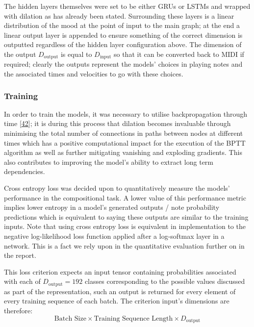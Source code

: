 \documentclass[12pt,]{article}
\begin{document}
The hidden layers themselves were set to be either GRUs or LSTMs and
wrapped with dilation as has already been stated. Surrounding these
layers is a linear distribution of the mood at the point of input to the
main graph; at the end a linear output layer is appended to ensure
something of the correct dimension is outputted regardless of the hidden
layer configuration above. The dimension of the output
\(D_{\text{output}}\) is equal to \(D_{\text{input}}\) so that it can be
converted back to MIDI if required; clearly the outputs represent the
models' choices in playing notes and the associated times and velocities
to go with these choices.

\hypertarget{training}{%
\subsubsection{Training}\label{training}}

In order to train the models, it was necessary to utilise
backpropagation through time
{[}\protect\hyperlink{ref-werbos1990backpropagation}{42}{]}; it is
during this process that dilation becomes invaluable through minimising
the total number of connections in paths between nodes at different
times which has a positive computational impact for the execution of the
BPTT algorithm as well as further mitigating vanishing and exploding
gradients. This also contributes to improving the model's ability to
extract long term dependencies.

Cross entropy loss was decided upon to quantitatively measure the
models' performance in the compositional task. A lower value of this
performance metric implies lower entropy in a model's generated outputs
/ note probability predictions which is equivalent to saying these
outputs are similar to the training inputs. Note that using cross
entropy loss is equivalent in implementation to the negative
log-likelihood loss function applied after a log-softmax layer in a
network. This is a fact we rely upon in the quantitative evaluation
further on in the report.

This loss criterion expects an input tensor containing probabilities
associated with each of \(D_{\text{output}} = 192\) classes
corresponding to the possible values discussed as part of the
representation, such an output is returned for every element of every
training sequence of each batch. The criterion input's dimensions are
therefore:
\[\text{Batch Size} \times \text{Training Sequence Length} \times D_{\text{output}}\]
\end{document}
